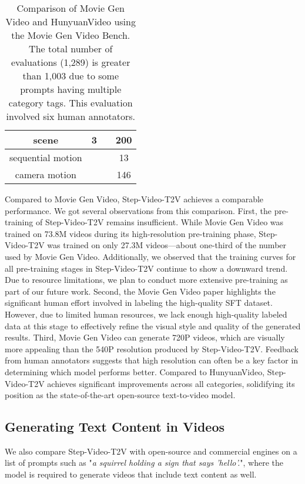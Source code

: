 \begin{table}[ht]
{\begin{tabular}{c|c|c|c}
\hline
scene & \cellcolor{green!20}{84-53-6}3 & \cellcolor{green!20}{91-58-51} & 200 \\
\hline
sequential motion & \cellcolor{green!20}{9-2-2} & \cellcolor{green!20}{6-2-5} & 13 \\
\hline
camera motion & \cellcolor{green!20}{59-37-50} & \cellcolor{green!20}{67-37-42} & 146 \\
\hline
\end{tabular}
}
\caption{Comparison of Movie Gen Video and HunyuanVideo using the Movie Gen Video Bench. The total number of evaluations (1,289) is greater than 1,003 due to some prompts having multiple category tags. This evaluation involved six human annotators.}
\label{ranking-moviegenbench}
\end{table}





Compared to Movie Gen Video, Step-Video-T2V achieves a comparable performance.
We got several observations from this comparison.
First, the pre-training of Step-Video-T2V remains insufficient. While Movie Gen Video was trained on 73.8M videos during its high-resolution pre-training phase, Step-Video-T2V was trained on only 27.3M videos—about one-third of the number used by Movie Gen Video. Additionally, we observed that the training curves for all pre-training stages in Step-Video-T2V continue to show a downward trend. Due to resource limitations, we plan to conduct more extensive pre-training as part of our future work.
Second, the Movie Gen Video paper highlights the significant human effort involved in labeling the high-quality SFT dataset. However, due to limited human resources, we lack enough high-quality labeled data at this stage to effectively refine the visual style and quality of the generated results.
Third, Movie Gen Video can generate 720P videos, which are visually more appealing than the 540P resolution produced by Step-Video-T2V. Feedback from human annotators suggests that high resolution can often be a key factor in determining which model performs better.
Compared to HunyuanVideo, Step-Video-T2V achieves significant improvements across all categories, solidifying its position as the state-of-the-art open-source text-to-video model.


\subsection{Generating Text Content in Videos}
We also compare Step-Video-T2V with open-source and commercial engines on a list of prompts such as "\textit{a squirrel holding a sign that says 'hello'.}", where the model is required to generate videos that include text content as well.


